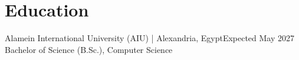 \section{Education}
    \resumeSubHeadingListStart

    \resumeSubheading
    {Alamein International University (AIU) | Alexandria, Egypt}{Expected May 2027}
    {Bachelor of Science (B.Sc.), Computer Science}{}
    \resumeItemListStart
    \resumeItemListEnd

    \resumeSubHeadingListEnd